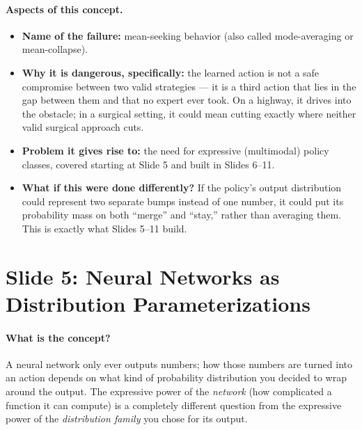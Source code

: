 \documentclass[11pt]{article}
\begin{document}
\paragraph{Aspects of this concept.}
\begin{itemize}
\item \textbf{Name of the failure:} mean-seeking behavior (also called mode-averaging or
mean-collapse).
\item \textbf{Why it is dangerous, specifically:} the learned action is not a safe
compromise between two valid strategies --- it is a third action that lies in the gap
between them and that no expert ever took. On a highway, it drives into the obstacle; in
a surgical setting, it could mean cutting exactly where neither valid surgical approach
cuts.
\item \textbf{Problem it gives rise to:} the need for expressive (multimodal) policy
classes, covered starting at Slide 5 and built in Slides 6--11.
\item \textbf{What if this were done differently?} If the policy's output distribution
could represent two separate bumps instead of one number, it could put its probability
mass on both ``merge'' and ``stay,'' rather than averaging them. This is exactly what
Slides 5--11 build.
\end{itemize}

\section{Slide 5: Neural Networks as Distribution Parameterizations}

\paragraph{What is the concept?}
A neural network only ever outputs numbers; how those numbers are turned into an action
depends on what kind of probability distribution you decided to wrap around the output.
The expressive power of the \emph{network} (how complicated a function it can compute)
is a completely different question from the expressive power of the \emph{distribution
family} you chose for its output.
\end{document}
